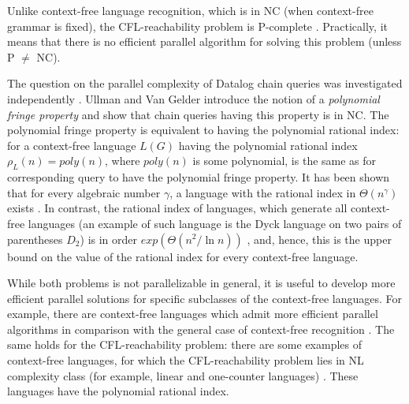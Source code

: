 \documentclass{ws-ijfcs}
\begin{document}
Unlike context-free language recognition, which is in NC (when context-free grammar is fixed), the CFL-reachability problem is P-complete \cite{ PCompl, RepSeq,  Yannakakis}. Practically, it means that there is no efficient parallel algorithm for solving this problem (unless P $\neq$ NC). 


The question on the parallel complexity of Datalog chain queries was investigated independently \cite{ChainQ, Vardi, Ullman}. Ullman and Van Gelder \cite{Ullman} introduce the notion of a \textit{polynomial fringe property} and show that chain queries having this property is in NC. The polynomial fringe property is equivalent to having the polynomial rational index: for a context-free language $L(G)$ having the polynomial rational index $\rho_L(n) = poly(n)$, where $poly(n)$ is some polynomial, is the same as for corresponding query to have the polynomial fringe property. It has been shown that for every algebraic number $\gamma$, a language with the rational index in $\Theta (n^\gamma )$ exists \cite{GreibRat}.  In contrast, the rational index of languages, which generate all context-free languages (an example of such language is the Dyck language on two pairs of parentheses $D_2$) is in order $exp(\Theta(n^2/\ln n))$ \cite{CFRat}, and, hence, this is the upper bound on the value of the rational index for every context-free language.


While both problems is not parallelizable in general, it is useful to develop more efficient parallel solutions for specific subclasses of the context-free languages. For example, there are context-free languages which admit more efficient parallel algorithms in comparison with the general case of context-free recognition \cite{IBARRA2, IBARRA, Okhotin2014ComplexityOI}.  The same holds for the CFL-reachability problem: there are some examples of context-free languages, for which the CFL-reachability problem lies in NL complexity class (for example, linear and one-counter languages) \cite{labelledGraphs, LReach, Regularrealizability, VyalyiRR}. These languages have the polynomial rational index.
\end{document}
